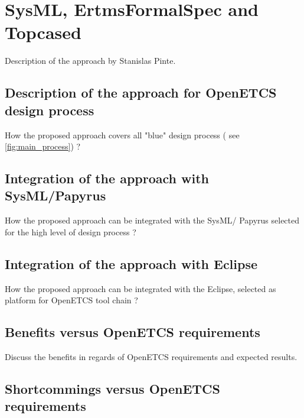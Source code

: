 \chapter{SysML, ErtmsFormalSpec and Topcased}
\label{sec:sysML-EFS}


\begin{todo_comment}
Description of the approach by Stanislas Pinte.
\end{todo_comment}

\section{Description of the approach for OpenETCS design process}

\begin{todo_comment}
How the proposed approach covers all "blue" design process ( see \ref{fig:main_process}) ?
\end{todo_comment}

\section{Integration of the approach with SysML/Papyrus}

\begin{todo_comment}
How the proposed approach can be integrated with the SysML/ Papyrus selected for the high level of design process ?
\end{todo_comment}

\section{Integration of the approach with Eclipse}

\begin{todo_comment}
How the proposed approach can be integrated with the Eclipse, selected as platform for OpenETCS tool chain ?
\end{todo_comment}

\section{Benefits versus OpenETCS requirements}

\begin{todo_comment}
Discuss the benefits in regards of OpenETCS requirements and expected results.
\end{todo_comment}

\section{Shortcommings versus OpenETCS requirements}

